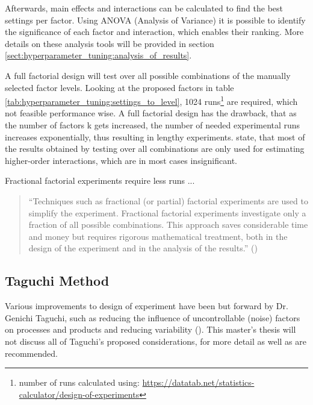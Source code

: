 Afterwards, main effects and interactions can be calculated to find the best settings per factor. Using ANOVA (Analysis of Variance) it is possible to identify the significance of each factor and interaction, which enables their ranking. More details on these analysis tools will be provided in section \ref{sect:hyperparameter_tuning:analysis_of_results}.

A full factorial design will test over all possible combinations of the manually selected factor levels. Looking at the proposed factors in table \ref{tab:hyperparameter_tuning:settings_to_level}, 1024 runs\footnote{number of runs calculated using: \url{https://datatab.net/statistics-calculator/design-of-experiments}} are required, which not feasible performance wise. A full factorial design has the drawback, that as the number of factors k gets increased, the number of needed experimental runs increases exponentially, thus resulting in lengthy experiments. \cite{yang_design_2009} state, that most of the results obtained by testing over all combinations are only used for estimating higher-order interactions, which are in most cases insignificant.

Fractional factorial experiments require less runs ... 

\begin{quote}
	\begin{em}
		\enquote{Techniques such as fractional (or partial) factorial experiments are used to simplify the experiment. Fractional factorial experiments investigate only a fraction of all possible combinations. This approach saves considerable time and money but requires rigorous mathematical treatment, both in the design of the experiment and in the analysis of the results.} (\cite{roy_primer_1990})
	\end{em}
\end{quote}


\subsection{Taguchi Method}
Various improvements to design of experiment have been but forward by Dr. Genichi Taguchi, such as reducing the influence of uncontrollable (noise) factors on processes and products and reducing variability (\cite{roy_primer_1990}). This master's thesis will not discuss all of Taguchi's proposed considerations, for more detail \cite{roy_primer_1990} as well as \cite{yang_design_2009} are recommended.

